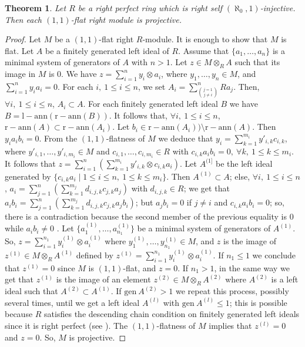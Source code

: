 \documentclass{amsart}
\newtheorem{theorem}{Theorem}[section]
\begin{document}
\begin{theorem}
\label{T:parfait} Let $R$ be a right perfect ring which is right self $(\aleph_0,1)$-injective. Then each $(1,1)$-flat right module is projective.
\end{theorem}
\begin{proof}
Let $M$ be a $(1,1)$-flat right $R$-module. It is enough to show that $M$ is flat. Let $A$ be a finitely generated left ideal of $R$. Assume that $\{a_1,\dots,a_n\}$ is a minimal system of generators of $A$ with $n>1$. Let $z\in M\otimes_RA$ such that its image in $M$ is $0$. We have $z=\sum_{i=1}^ny_i\otimes a_i$, where $y_1,\dots,y_n\in M$, and $\sum_{i=1}^ny_ia_i=0$. For each $i,\ 1\leq i\leq n$, we set $A_i=\sum_{\binom{j=1}{j\ne i}}^nRa_j$. Then, $\forall i,\ 1\leq i\leq n$, $A_i\subset A$. For each finitely generated left ideal $B$ we have $B=\mathrm{l-ann}(\mathrm{r-ann}(B))$. It follows that, $\forall i,\ 1\leq i\leq n$, $\mathrm{r-ann}(A)\subset \mathrm{r-ann}(A_i)$. Let $b_i\in \mathrm{r-ann}(A_i))\setminus \mathrm{r-ann}(A)$. Then $y_ia_ib_i=0$. From the $(1,1)$-flatness of $M$ we deduce that $y_i=\sum_{k=1}^{m_i}y'_{i,k}c_{i,k}$, where $y'_{i,1},\dots,y'_{i,m_i}\in M$ and $c_{i,1},\dots,c_{i,m_i}\in R$ with $c_{i,k}a_ib_i=0,\ \forall k,\ 1\leq k\leq m_i$. It follows that $z=\sum_{i=1}^n(\sum_{k=1}^{m_i}y'_{i,k}\otimes c_{i,k}a_i)$. Let $A^{(1]}$ be the left ideal generated by $\{c_{i,k}a_i\mid 1\leq i\leq n,\ 1\leq k\leq m_i\}$. Then $A^{(1)}\subset A$; else, $\forall i,\ 1\leq i\leq n$, $a_i=\sum_{j=1}^{n}(\sum_{k=1}^{m_j}d_{i,j,k}c_{j,k}a_j)$ with $d_{i,j,k}\in R$; we get that $a_ib_i=\sum_{j=1}^{n}(\sum_{k=1}^{m_j}d_{i,j,k}c_{j,k}a_jb_i)$; but $a_jb_i=0$ if $j\ne i$ and $c_{i,k}a_ib_i=0$; so, there is a contradiction because the second member of the previous equality is $0$ while $a_ib_i\ne 0$ . Let $\{a^{(1)}_1,\dots,a^{(1)}_{n_1}\}$ be a minimal system of generators of $A^{(1)}$. So, $z=\sum_{i=1}^{n_1}y^{(1)}_i\otimes a^{(1)}_i$ where $y^{(1)}_1,\dots,y^{(1)}_{n_1}\in M$, and $z$ is the image of $z^{(1)}\in M\otimes_RA^{(1)}$ defined by $z^{(1)}=\sum_{i=1}^{n_1}y^{(1)}_i\otimes a^{(1)}_i$. If $n_1\leq 1$ we conclude that $z^{(1)}=0$ since $M$ is $(1,1)$-flat, and $z=0$. If $n_1>1$, in the same way we get that $z^{(1)}$ is the image of an element $z^{(2)}\in M\otimes_RA^{(2)}$ where $A^{(2)}$ is a left ideal such that $A^{(2)}\subset A^{(1)}$. If $\mathrm{gen}\ A^{(2)}>1$ we repeat this process, possibly several times, until we get a left ideal $A^{(l)}$ with $\mathrm{gen}\ A^{(l)}\leq 1$; this is possible because $R$ satisfies the descending chain condition on finitely generated left ideals since it is right perfect (see \cite[Th\'eor\`eme 5 p.130]{Ren75}). The $(1,1)$-flatness of $M$ implies that $z^{(l)}=0$ and $z=0$. So, $M$ is projective.
\end{proof}
\end{document}
